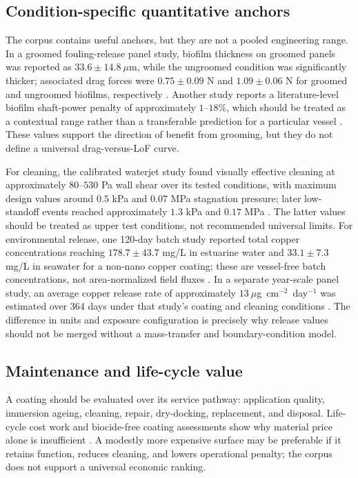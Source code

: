\subsection{Condition-specific quantitative anchors}
The corpus contains useful anchors, but they are not a pooled engineering range. In a groomed fouling-release panel study, biofilm thickness on groomed panels was reported as $33.6\pm14.8~\mu$m, while the ungroomed condition was significantly thicker; associated drag forces were $0.75\pm0.09$ N and $1.09\pm0.06$ N for groomed and ungroomed biofilms, respectively \cite{hunsucker_biofilm_2018}. Another study reports a literature-level biofilm shaft-power penalty of approximately $1$--$18\%$, which should be treated as a contextual range rather than a transferable prediction for a particular vessel \cite{snowdon_surface_2023}. These values support the direction of benefit from grooming, but they do not define a universal drag-versus-LoF curve.

For cleaning, the calibrated waterjet study found visually effective cleaning at approximately $80$--$530$ Pa wall shear over its tested conditions, with maximum design values around $0.5$ kPa and $0.07$ MPa stagnation pressure; later low-standoff events reached approximately $1.3$ kPa and $0.17$ MPa \cite{oliveira_ship_2020}. The latter values should be treated as upper test conditions, not recommended universal limits. For environmental release, one 120-day batch study reported total copper concentrations reaching $178.7\pm43.7$ mg/L in estuarine water and $33.1\pm7.3$ mg/L in seawater for a non-nano copper coating; these are vessel-free batch concentrations, not area-normalized field fluxes \cite{miller_nano_2020}. In a separate year-scale panel study, an average copper release rate of approximately $13~\mu$g~cm$^{-2}$~day$^{-1}$ was estimated over 364 days under that study's coating and cleaning conditions \cite{oliveira_ship_2020}. The difference in units and exposure configuration is precisely why release values should not be merged without a mass-transfer and boundary-condition model.

\subsection{Maintenance and life-cycle value}
A coating should be evaluated over its service pathway: application quality, immersion ageing, cleaning, repair, dry-docking, replacement, and disposal. Life-cycle cost work and biocide-free coating assessments show why material price alone is insufficient \cite{korican_life-cycle_2024,venettacci_environmental_2023,oliveira_novel_2022}. A modestly more expensive surface may be preferable if it retains function, reduces cleaning, and lowers operational penalty; the corpus does not support a universal economic ranking.

